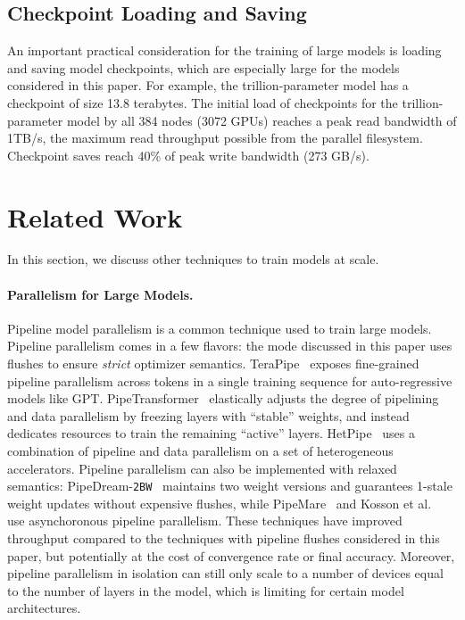\subsection{Checkpoint Loading and Saving}

An important practical consideration for the training of large models is loading and saving model checkpoints, which are especially large for the models considered in this paper. For example, the trillion-parameter model has a checkpoint of size 13.8 terabytes. The initial load of checkpoints for the trillion-parameter model by all 384 nodes (3072 GPUs) reaches a peak read bandwidth of 1TB/s, the maximum read throughput possible from the parallel filesystem. Checkpoint saves reach 40\% of peak write bandwidth (273 GB/s).

\section{Related Work}

In this section, we discuss other techniques to train models at scale.

\paragraph{Parallelism for Large Models.} Pipeline model parallelism is a common technique used to train large models. Pipeline parallelism comes in a few flavors: the mode discussed in this paper uses flushes to ensure \emph{strict} optimizer semantics. TeraPipe~\cite{li2021terapipe} exposes fine-grained pipeline parallelism across tokens in a single training sequence for auto-regressive models like GPT. PipeTransformer~\cite{he2021pipetransformer} elastically adjusts the degree of pipelining and data parallelism by freezing layers with ``stable'' weights, and instead dedicates resources to train the remaining ``active'' layers. HetPipe~\cite{park2020hetpipe} uses a combination of pipeline and data parallelism on a set of heterogeneous accelerators. Pipeline parallelism can also be implemented with relaxed semantics: PipeDream-\texttt{2BW}~\cite{narayanan2021memory} maintains two weight versions and guarantees 1-stale weight updates without expensive flushes, while PipeMare~\cite{yang2021pipemare} and Kosson et al.~\cite{pb2021kosson} use asynchoronous pipeline parallelism. These techniques have improved throughput compared to the techniques with pipeline flushes considered in this paper, but potentially at the cost of convergence rate or final accuracy. Moreover, pipeline parallelism in isolation can still only scale to a number of devices equal to the number of layers in the model, which is limiting for certain model architectures.

